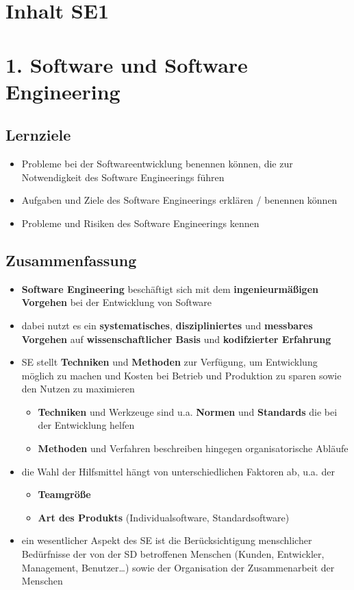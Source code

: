 \section{Inhalt SE1}

\section*{1. Software und Software Engineering}
\subsection*{Lernziele}
\begin{itemize}
    \item Probleme bei der Softwareentwicklung benennen können, die zur Notwendigkeit des Software Engineerings führen
    \item Aufgaben und Ziele des Software Engineerings erklären / benennen können
    \item Probleme und Risiken des Software Engineerings kennen
\end{itemize}

\subsection*{Zusammenfassung}

\begin{itemize}
    \item \textbf{Software Engineering} beschäftigt sich mit dem \textbf{ingenieurmäßigen Vorgehen} bei der Entwicklung von Software
    \item dabei nutzt es ein \textbf{systematisches}, \textbf{diszipliniertes} und \textbf{messbares Vorgehen} auf \textbf{wissenschaftlicher Basis} und \textbf{kodifzierter Erfahrung}
    \item SE stellt \textbf{Techniken} und \textbf{Methoden} zur Verfügung, um Entwicklung möglich zu machen und Kosten bei Betrieb und Produktion zu sparen sowie den Nutzen zu maximieren
    \begin{itemize}
        \item \textbf{Techniken} und Werkzeuge sind u.a. \textbf{Normen} und \textbf{Standards} die bei der Entwicklung helfen
        \item \textbf{Methoden} und Verfahren beschreiben hingegen organisatorische Abläufe
    \end{itemize}
    \item die Wahl der Hilfsmittel hängt von unterschiedlichen Faktoren ab, u.a. der
    \begin{itemize}
        \item \textbf{Teamgröße}
        \item \textbf{Art des Produkts} (Individualsoftware, Standardsoftware)
    \end{itemize}
    \item ein wesentlicher Aspekt des SE ist die Berücksichtigung menschlicher Bedürfnisse der von der SD betroffenen Menschen (Kunden, Entwickler, Management, Benutzer\ldots) sowie der Organisation der Zusammenarbeit der Menschen
\end{itemize}

